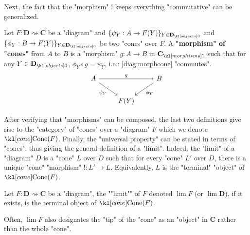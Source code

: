 \documentclass[main.tex]{subfiles}
\begin{document}
Next, the fact that the "morphism" $!$ keeps everything "commutative" can be generalized.
\begin{defn}
    Let $F:\mathbf{D}\rightsquigarrow \mathbf{C}$ be a "diagram" and $\{\psi_Y: A \rightarrow F(Y)\}_{Y \in \obj{\mathbf{D}}}$ and $\{\phi_Y: B\rightarrow F(Y)\}_{Y \in \obj{\mathbf{D}}}$ be two "cones" over $F$. A \textbf{"morphism" of "cones"} from $A$ to $B$ is a "morphism" $g:A\rightarrow B$ in $\mor{\mathbf{C}}$ such that for any $Y\in \obj{\mathbf{D}}$, $\phi_Y \circ g = \psi_Y$, i.e.: \eqref{diag:morphcone} "commutes".
    \begin{equation}\label{diag:morphcone}
        \begin{tikzcd}
            A \arrow[rr, "g"] \arrow[rd, "\psi_Y"'] &  & B \arrow[ld, "\phi_Y"] \\
             & F(Y) & 
        \end{tikzcd}
    \end{equation}
\end{defn}
After verifying that "morphisms" can be composed, the last two definitions give rise to the "category" of "cones" over a "diagram" $F$ which we denote $\cone(F)$. Finally, the "universal property" can be stated in terms of "cones", thus giving the general definition of a "limit". Indeed, the "limit" of a "diagram" $D$ is a "cone" $L$ over $D$ such that for every "cone" $L'$ over $D$, there is a unique "cone" "morphism" $!:L'\rightarrow L$. Equivalently, $L$ is the "terminal" "object" of $\cone(F)$.
\begin{defn}[Limit]
    \AP Let $F:\mathbf{D} \rightsquigarrow \mathbf{C}$ be a "diagram", the ""limit"" of $F$ denoted $\lim F$ (or $\lim \mathbf{D}$), if it exists, is the terminal object of $\cone(F)$.
\end{defn}
\begin{rem}
    Often, $\lim F$ also designates the "tip" of the "cone" as an "object" in $\mathbf{C}$ rather than the whole "cone".
\end{rem}
\end{document}
